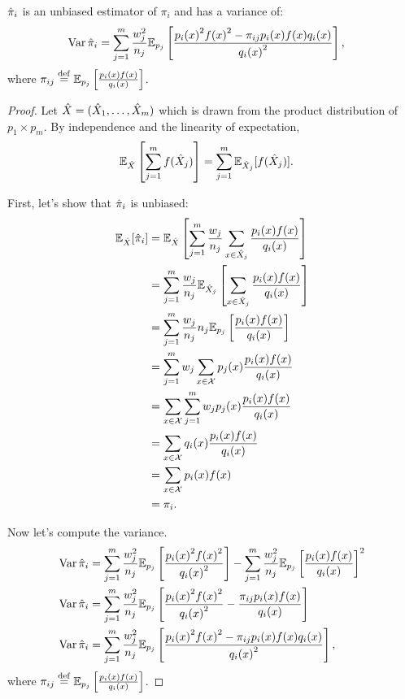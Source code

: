 \begin{theorem}
  ${\hat{\pi}}_i$ is an unbiased estimator of $\pi_i$ and has a variance of:
  \begin{align*}
    \operatorname{Var}{{\hat{\pi}}_i} &= \sum_{j=1}^m \frac{w_j^2}{n_j} \mathbb{E}_{p_j}\left[\frac{{p_i(x)}^2{f(x)}^2 - \pi_{ij}p_i(x)f(x)q_i(x)}{{q_i(x)}^2} \right],
  \end{align*}
  where $\pi_{ij} \stackrel{\rm def}{=} \mathbb{E}_{p_j}\left[\frac{p_i(x)f(x)}{q_i(x)} \right]$.
\end{theorem}
\begin{proof}
  Let ${\hat{X}} = ({\hat{X}}_1, \ldots, {\hat{X}}_m)$ which is drawn from the product distribution of $p_1 \times p_m$.
  By independence and the linearity of expectation, 
  \begin{align*}
    \mathbb{E}_{{\hat{X}}}\left[\sum_{j=1}^m f({\hat{X}}_j) \right] &= \sum_{j=1}^m \mathbb{E}_{{\hat{X}}_j}[f({\hat{X}}_j)].
  \end{align*}

  First, let's show that ${\hat{\pi}}_i$ is unbiased:
  \begin{align*}
    \mathbb{E}_{{\hat{X}}}[{\hat{\pi}}_i] 
    &= \mathbb{E}_{{\hat{X}}}\left[\sum_{j=1}^m \frac{w_j}{n_j} \sum_{x \in {\hat{X}}_j} \frac{p_i(x) f(x)}{q_i(x)} \right] \\
    &= \sum_{j=1}^m \frac{w_j}{n_j} \mathbb{E}_{{\hat{X}}_j}\left[\sum_{x \in {\hat{X}}_j} \frac{p_i(x) f(x)}{q_i(x)} \right] \\
    &= \sum_{j=1}^m \frac{w_j}{n_j} n_j \mathbb{E}_{p_j}\left[\frac{p_i(x) f(x)}{q_i(x)}\right] \\
    &= \sum_{j=1}^m w_j \sum_{x \in \mathcal{X}} p_j(x) \frac{p_i(x) f(x) }{q_i(x)}\\
    &= \sum_{x \in \mathcal{X}} \sum_{j=1}^m w_j p_j(x) \frac{p_i(x) f(x) }{q_i(x)}\\
    &= \sum_{x \in \mathcal{X}} q_i(x) \frac{p_i(x) f(x)}{q_i(x)} \\
    &= \sum_{x \in \mathcal{X}} p_i(x) f(x) \\
    &= \pi_i.
  \end{align*}

  Now let's compute the variance.
  \begin{align*}
    \operatorname{Var}{{\hat{\pi}}_i} &= \sum_{j=1}^m \frac{w_j^2}{n_j} \mathbb{E}_{p_j}\left[\frac{{p_i(x)}^2{f(x)}^2}{{q_i(x)}^2} \right]
    - \sum_{j=1}^m \frac{w_j^2}{n_j} {\mathbb{E}_{p_j}\left[\frac{p_i(x)f(x)}{q_i(x)} \right]}^2 \\
    \operatorname{Var}{{\hat{\pi}}_i} &= \sum_{j=1}^m \frac{w_j^2}{n_j} \mathbb{E}_{p_j}\left[\frac{{p_i(x)}^2{f(x)}^2}{{q_i(x)}^2} - \frac{\pi_{ij} p_i(x) f(x)}{q_i(x)} \right] \\
    \operatorname{Var}{{\hat{\pi}}_i} &= \sum_{j=1}^m \frac{w_j^2}{n_j} \mathbb{E}_{p_j}\left[\frac{{p_i(x)}^2{f(x)}^2 - \pi_{ij}p_i(x)f(x)q_i(x)}{{q_i(x)}^2} \right],
  \end{align*}
  where $\pi_{ij} \stackrel{\rm def}{=} \mathbb{E}_{p_j}\left[\frac{p_i(x)f(x)}{q_i(x)} \right]$.
\end{proof}

